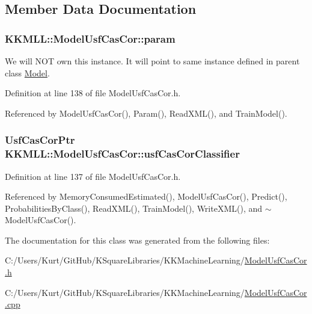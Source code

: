 \subsection{Member Data Documentation}
\subsubsection[{\texorpdfstring{param}{param}}]{ K\+K\+M\+L\+L\+::\+Model\+Usf\+Cas\+Cor\+::param\hspace{0.3cm}{\ttfamily [protected]}}\hypertarget{class_k_k_m_l_l_1_1_model_usf_cas_cor_a36a6059d8c3bf8c01d1ab95eb37da770}{}\label{class_k_k_m_l_l_1_1_model_usf_cas_cor_a36a6059d8c3bf8c01d1ab95eb37da770}
We will N\+OT own this instance. It will point to same instance defined in parent class \hyperlink{class_k_k_m_l_l_1_1_model}{Model}. 

Definition at line 138 of file Model\+Usf\+Cas\+Cor.\+h.



Referenced by Model\+Usf\+Cas\+Cor(), Param(), Read\+X\+M\+L(), and Train\+Model().

\subsubsection[{\texorpdfstring{usf\+Cas\+Cor\+Classifier}{usfCasCorClassifier}}]{\setlength{\rightskip}{0pt plus 5cm}Usf\+Cas\+Cor\+Ptr K\+K\+M\+L\+L\+::\+Model\+Usf\+Cas\+Cor\+::usf\+Cas\+Cor\+Classifier\hspace{0.3cm}{\ttfamily [protected]}}\hypertarget{class_k_k_m_l_l_1_1_model_usf_cas_cor_a7aeb7274e64e73ccfeea3a9da6633d60}{}\label{class_k_k_m_l_l_1_1_model_usf_cas_cor_a7aeb7274e64e73ccfeea3a9da6633d60}


Definition at line 137 of file Model\+Usf\+Cas\+Cor.\+h.



Referenced by Memory\+Consumed\+Estimated(), Model\+Usf\+Cas\+Cor(), Predict(), Probabilities\+By\+Class(), Read\+X\+M\+L(), Train\+Model(), Write\+X\+M\+L(), and $\sim$\+Model\+Usf\+Cas\+Cor().



The documentation for this class was generated from the following files\+:\begin{DoxyCompactItemize}
\item 
C\+:/\+Users/\+Kurt/\+Git\+Hub/\+K\+Square\+Libraries/\+K\+K\+Machine\+Learning/\hyperlink{_model_usf_cas_cor_8h}{Model\+Usf\+Cas\+Cor.\+h}\item 
C\+:/\+Users/\+Kurt/\+Git\+Hub/\+K\+Square\+Libraries/\+K\+K\+Machine\+Learning/\hyperlink{_model_usf_cas_cor_8cpp}{Model\+Usf\+Cas\+Cor.\+cpp}\end{DoxyCompactItemize}
